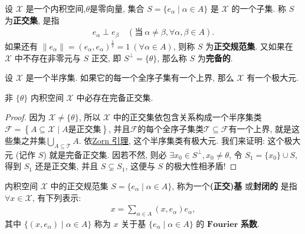 \documentclass[../../main.tex]{subfiles}%
\begin{document}
\begin{definition}
设 $\mathscr{X}$ 是一个内积空间,$\theta$是零向量, 集合 $S=\{e_\alpha\mid\alpha\in A\}$ 是 $\mathscr{X}$ 的一个子集. 称 $S$ 为\textbf{正交集}, 是指
\begin{align*}
e_\alpha\perp e_\beta\quad(\text{当}\ \alpha\neq\beta,\forall\alpha,\beta\in A).
\end{align*}
如果还有 $\|e_\alpha\|=(e_\alpha,e_\alpha)^{\frac{1}{2}}=1\ (\forall\alpha\in A)$, 则称 $S$ 为\textbf{正交规范集}. 又如果在 $\mathscr{X}$ 中不存在非零元与 $S$ 正交, 即 $S^\perp=\{\theta\}$, 那么称 $S$ 为\textbf{完备的}.
\end{definition}

\begin{lemma}[Zorn引理]\label{lemma:泛函分析--Zorn引理}
设 $\mathscr{X}$ 是一个半序集. 如果它的每一个全序子集有一个上界, 那么 $\mathscr{X}$ 有一个极大元.
\end{lemma}

\begin{proposition}
非 $\{\theta\}$ 内积空间 $\mathscr{X}$ 中必存在完备正交集.
\end{proposition}
\begin{proof}
因为 $\mathscr{X}\neq\{\theta\}$, 所以 $\mathscr{X}$ 中的正交集依包含关系构成一个半序集类$\mathcal{F} =\left\{ A\subseteq \mathscr{X} \mid A\text{是正交集} \right\} $, 并且$\mathcal{F}$的每个全序子集类$\mathcal{T} \subseteq \mathcal{F}$有一个上界, 就是这些集之并集$\bigcup_{A\subseteq \mathcal{T}}{A}$. 依\hyperref[lemma:泛函分析--Zorn引理]{Zorn 引理}, 这个半序集类有极大元. 我们来证明: 这个极大元 (记作 $S$) 就是完备正交集. 因若不然, 则必 $\exists x_0\in S^\perp,x_0\neq\theta$, 令 $S_1=\{x_0\}\cup S$, 得到 $S_1$ 还是正交集, 并且 $S\subsetneq S_1$, 这便与 $S$ 的极大性相矛盾!
\end{proof}

\begin{definition}
内积空间 $\mathscr{X}$ 中的正交规范集 $S=\{e_\alpha\mid\alpha\in A\}$, 称为一个\textbf{(正交)基} 或\textbf{封闭的} 是指 $\forall x\in\mathscr{X}$, 有下列表示:
\begin{align*}
x=\sum\limits_{\alpha\in A}(x,e_\alpha)e_\alpha,
\end{align*}
其中 $\{(x,e_\alpha)\mid\alpha\in A\}$ 称为 $x$ 关于基 $\{e_\alpha\mid\alpha\in A\}$ 的 $\mathbf{Fourier}$ \textbf{系数}.
\end{definition}
\end{document}
